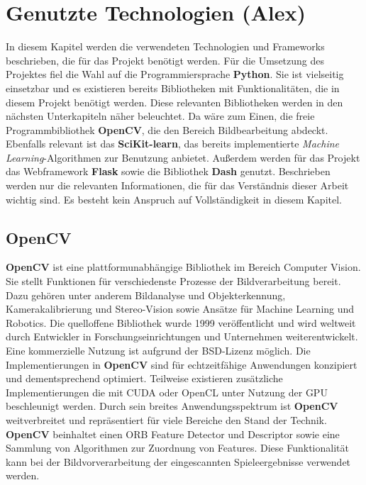 \section{Genutzte Technologien (Alex)}
In diesem Kapitel werden die verwendeten Technologien und Frameworks beschrieben, die für das Projekt benötigt werden.
Für die Umsetzung des Projektes fiel die Wahl auf die Programmiersprache \textbf{Python}. Sie ist vielseitig einsetzbar und es existieren bereits Bibliotheken mit
Funktionalitäten, die in diesem Projekt benötigt werden. Diese relevanten Bibliotheken werden in den nächsten Unterkapiteln näher beleuchtet.
Da wäre zum Einen, die freie Programmbibliothek \textbf{OpenCV}, die den Bereich Bildbearbeitung abdeckt. Ebenfalls relevant ist das \textbf{SciKit-learn}, das 
bereits implementierte \textit{Machine Learning}-Algorithmen zur Benutzung anbietet. Außerdem werden für das Projekt das Webframework \textbf{Flask} sowie
die Bibliothek \textbf{Dash} genutzt. Beschrieben werden nur die relevanten Informationen, die für das Verständnis dieser Arbeit wichtig sind. 
Es besteht kein Anspruch auf Vollständigkeit in diesem Kapitel.

\subsection{OpenCV}
\textbf{OpenCV} ist eine plattformunabhängige Bibliothek im Bereich Computer Vision. Sie stellt Funktionen für verschiedenste Prozesse der Bildverarbeitung bereit.
Dazu gehören unter anderem Bildanalyse und Objekterkennung, Kamerakalibrierung und Stereo-Vision sowie Ansätze für Machine Learning und Robotics.
Die quelloffene Bibliothek wurde 1999 veröffentlicht und wird weltweit durch Entwickler in Forschungseinrichtungen und Unternehmen weiterentwickelt. 
Eine kommerzielle Nutzung ist aufgrund der BSD-Lizenz möglich. Die Implementierungen in \textbf{OpenCV} sind für echtzeitfähige Anwendungen konzipiert 
und dementsprechend optimiert. 
Teilweise existieren zusätzliche Implementierungen die mit CUDA oder OpenCL unter Nutzung der GPU beschleunigt werden.
Durch sein breites Anwendungsspektrum ist \textbf{OpenCV} weitverbreitet und repräsentiert für viele Bereiche den Stand der Technik. 
\textbf{OpenCV} beinhaltet einen ORB Feature Detector und Descriptor sowie eine Sammlung von Algorithmen zur Zuordnung von Features.
Diese Funktionalität kann bei der Bildvorverarbeitung der eingescannten Spieleergebnisse verwendet werden.

